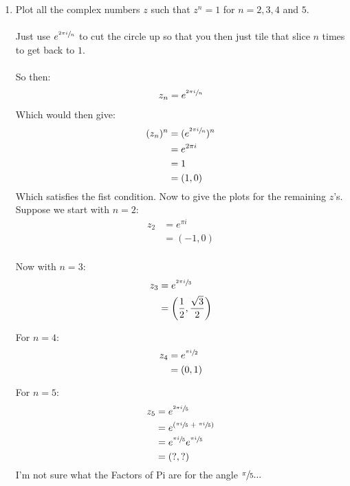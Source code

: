\begin{enumerate}
	\item Plot all the complex numbers $z$ such that $z^n = 1$ for $ n = 2, 3, 4$ and $5.$ \\
	\\
	Just use $ e^{ \sfrac{2 \pi i}{n} } $ to cut the circle up so that you then just tile that slice $n$ times to get back to $1.$ \\
	\\
	So then:
	\begin{align*}
		z_n &= e^{ \sfrac{2 \pi i}{n} } \\
	\end{align*}
	Which would then give:
	\begin{align*}
		(z_n)^n &= ( e^{ \sfrac{2 \pi i}{n} } )^n \\
		&= e^{2 \pi i } \\
		&= 1 \\
		& = (1, 0) \\
	\end{align*}
	Which satisfies the fist condition. Now to give the plots for the remaining $z$'s.\\

	Suppose we start with $n = 2:$
	\begin{align*}
		z_2 &= e^{ \pi i}  \\
		&= (-1, 0) \\
	\end{align*}

	Now with $n = 3:$
	\begin{align*}
		z_3 &= e^{\sfrac{2 \pi i}{3}} \\
		&= \left( \frac{1}{2}, \frac{\sqrt{3}}{2} \right) \\
	\end{align*}

	For $n = 4:$ \\
	\begin{align*}
		z_4 &= e^{\sfrac{\pi i}{2}} \\
		&= ( 0, 1 )
	\end{align*}

	For $n = 5:$ \\
	\begin{align*}
		z_5 &= e^{\sfrac{2 \pi i}{5}} \\
		&= e^{(\sfrac{\pi i}{5} \; + \; \sfrac{\pi i}{5})} \\
		&= e^{\sfrac{\pi i}{5}} e^{\sfrac{\pi i}{5}} \\
		&= (?, ?)
	\end{align*}
	I'm not sure what the Factors of Pi are for the angle $\sfrac{\pi}{5}...$
	


\end{enumerate}
